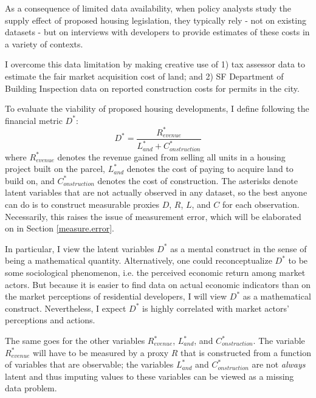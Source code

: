 \documentclass[a4paper,12pt]{article}
\begin{document}
As a consequence of limited data availability, when policy analysts study the supply effect of proposed housing legislation, they typically rely - not on existing datasets - but on interviews with developers to provide estimates of these costs in a variety of contexts.

I overcome this data limitation by making creative use of 1) tax assessor data to estimate the fair market acquisition cost of land; and 2) SF Department of Building Inspection data on reported construction costs for permits in the city. 

To evaluate the viability of proposed housing developments, I define following the financial metric $D^*$:
\[
D^* = \frac{R^{*}_{evenue}}{L^{*}_{and} + C^{*}_{onstruction}}
\]
where $R^{*}_{evenue}$ denotes the revenue gained from selling all units in a housing project built on the parcel, $L^{*}_{and}$ denotes the cost of paying to acquire land to build on, and $C^{*}_{onstruction}$ denotes the cost of construction. The asterisks denote latent variables that are not actually observed in any dataset, so the best anyone can do is to construct measurable proxies $D$, $R$, $L$, and $C$ for each observation. Necessarily, this raises the issue of measurement error,\cite{treier2008democracy}\cite{baltagi2008companion} which will be elaborated on in Section \ref{measure.error}.

In particular, I view the latent variables $D^*$ as a mental construct in the sense of being a mathematical quantity. Alternatively, one could reconceptualize $D^{*}$ to be some sociological phenomenon, i.e. the perceived economic return among market actors. But because it is easier to find data on actual economic indicators than on the market perceptions of residential developers, I will view $D^{*}$ as a mathematical construct. Nevertheless, I expect $D^{*}$ is highly correlated with market actors' perceptions and actions.

The same goes for the other variables $R^{*}_{evenue}$, $L^{*}_{and}$, and $C^{*}_{onstruction}$. The variable $R^{*}_{evenue}$ will have to be measured by a proxy $R$ that is constructed from a function of variables that are observable; the variables $L^{*}_{and}$ and $C^{*}_{onstruction}$ are not \textit{always} latent and thus imputing values to these variables can be viewed as a missing data problem.
\end{document}
